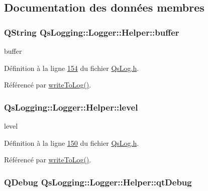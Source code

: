 \subsection{Documentation des données membres}
\hypertarget{classQsLogging_1_1Logger_1_1Helper_ac7ad574c2643ca74519e49ff1f51aad4}{
\subsubsection[{buffer}]{\setlength{\rightskip}{0pt plus 5cm}Q\-String Qs\-Logging\-::\-Logger\-::\-Helper\-::buffer\hspace{0.3cm}{\ttfamily [private]}}}\label{classQsLogging_1_1Logger_1_1Helper_ac7ad574c2643ca74519e49ff1f51aad4}


buffer 



Définition à la ligne \hyperlink{QsLog_8h_source_l00154}{154} du fichier \hyperlink{QsLog_8h_source}{Qs\-Log.\-h}.



Référencé par \hyperlink{classQsLogging_1_1Logger_1_1Helper_a30e01167d1f088bade18b71a3e85379b}{write\-To\-Log()}.

\hypertarget{classQsLogging_1_1Logger_1_1Helper_a8de516c069064c29643f7bd1face4f32}{
\subsubsection[{level}]{ Qs\-Logging\-::\-Logger\-::\-Helper\-::level\hspace{0.3cm}{\ttfamily [private]}}}\label{classQsLogging_1_1Logger_1_1Helper_a8de516c069064c29643f7bd1face4f32}


level 



Définition à la ligne \hyperlink{QsLog_8h_source_l00150}{150} du fichier \hyperlink{QsLog_8h_source}{Qs\-Log.\-h}.



Référencé par \hyperlink{classQsLogging_1_1Logger_1_1Helper_a30e01167d1f088bade18b71a3e85379b}{write\-To\-Log()}.

\hypertarget{classQsLogging_1_1Logger_1_1Helper_a5a1c439896fc0737f578a04cbbe6fa65}{
\subsubsection[{qt\-Debug}]{\setlength{\rightskip}{0pt plus 5cm}Q\-Debug Qs\-Logging\-::\-Logger\-::\-Helper\-::qt\-Debug\hspace{0.3cm}{\ttfamily [private]}}}\label{classQsLogging_1_1Logger_1_1Helper_a5a1c439896fc0737f578a04cbbe6fa65}



